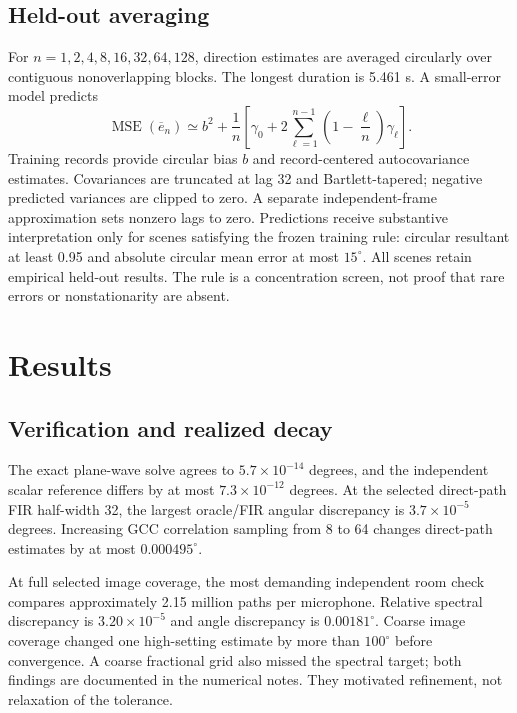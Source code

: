 \documentclass[10pt,a4paper,twocolumn]{article}
\begin{document}
\subsection{Held-out averaging}
For $n=1,2,4,8,16,32,64,128$, direction estimates are averaged circularly over contiguous nonoverlapping blocks. The longest duration is 5.461 s. A small-error model predicts
\begin{equation}
 \operatorname{MSE}(\overline e_n)\simeq b^2+
 \frac{1}{n}\left[\gamma_0+2\sum_{\ell=1}^{n-1}
 \left(1-\frac{\ell}{n}\right)\gamma_\ell\right].
 \label{eq:variance}
\end{equation}
Training records provide circular bias $b$ and record-centered autocovariance estimates. Covariances are truncated at lag 32 and Bartlett-tapered; negative predicted variances are clipped to zero. A separate independent-frame approximation sets nonzero lags to zero. Predictions receive substantive interpretation only for scenes satisfying the frozen training rule: circular resultant at least 0.95 and absolute circular mean error at most $15^\circ$. All scenes retain empirical held-out results. The rule is a concentration screen, not proof that rare errors or nonstationarity are absent.

\section{Results}
\subsection{Verification and realized decay}
The exact plane-wave solve agrees to $5.7\times10^{-14}$ degrees, and the independent scalar reference differs by at most $7.3\times10^{-12}$ degrees. At the selected direct-path FIR half-width 32, the largest oracle/FIR angular discrepancy is $3.7\times10^{-5}$ degrees. Increasing GCC correlation sampling from 8 to 64 changes direct-path estimates by at most $0.000495^\circ$.

At full selected image coverage, the most demanding independent room check compares approximately 2.15 million paths per microphone. Relative spectral discrepancy is $3.20\times10^{-5}$ and angle discrepancy is $0.00181^\circ$. Coarse image coverage changed one high-setting estimate by more than $100^\circ$ before convergence. A coarse fractional grid also missed the spectral target; both findings are documented in the numerical notes. They motivated refinement, not relaxation of the tolerance.
\end{document}
